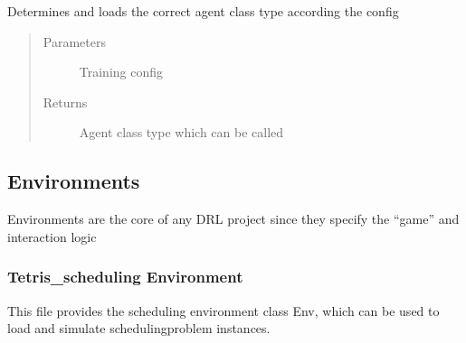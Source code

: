 \documentclass[letterpaper,10pt,english]{sphinxmanual}
\begin{document}
\begin{fulllineitems}
\sphinxAtStartPar
Determines and loads the correct agent class type according the config
\begin{quote}\begin{description}
\item[{Parameters}] \leavevmode
\sphinxAtStartPar
{} \textendash{} Training config

\item[{Returns}] \leavevmode
\sphinxAtStartPar
Agent class type which can be called

\end{description}\end{quote}

\end{fulllineitems}



\subsection{Environments}
\label{\detokenize{environments:environments}}\label{\detokenize{environments::doc}}
\sphinxAtStartPar
Environments are the core of any DRL project since they specify the “game” and interaction logic


\subsubsection{Tetris\_scheduling Environment}
\label{\detokenize{environments:module-environments.env_tetris_scheduling}}\label{\detokenize{environments:tetris-scheduling-environment}}
\sphinxAtStartPar
This file provides the scheduling environment class Env,
which can be used to load and simulate scheduling\sphinxhyphen{}problem instances.
\end{document}
